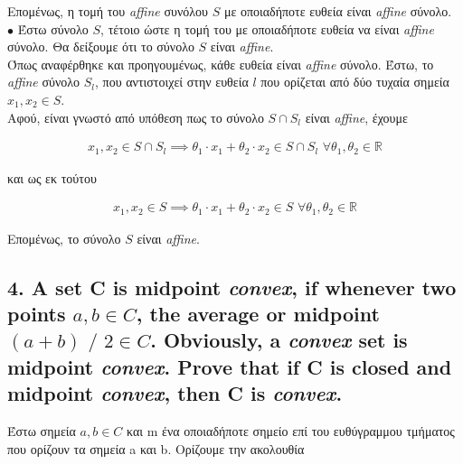 \documentclass[12pt]{article}
\newcommand{\R}{\mathbb{R}}
\newcommand{\margin}{\hspace{4pt}}
\begin{document}
Επομένως, η τομή του \textit{affine} συνόλου $S$ με οποιαδήποτε ευθεία είναι \textit{affine} σύνολο.\\

$\bullet$ Έστω σύνολο $S$, τέτοιο ώστε η τομή του με οποιαδήποτε ευθεία να είναι \textit{affine} σύνολο.
Θα δείξουμε ότι το σύνολο $S$ είναι \textit{affine}.\\

Όπως αναφέρθηκε και προηγουμένως, κάθε ευθεία είναι \textit{affine} σύνολο.
Έστω, το \textit{affine} σύνολο $S_l$, που αντιστοιχεί στην ευθεία $l$
που ορίζεται από δύο τυχαία σημεία $x_1, x_2 \in S$.\\

Αφού, είναι γνωστό από υπόθεση πως το σύνολο $S \cap S_l$ είναι \textit{affine}, έχουμε

\begin{align*}
    x_1, x_2 \in S \cap S_l \implies  \theta_1 \cdot x_1 + \theta_2 \cdot x_2 \in S \cap S_l \margin \forall \theta_1, \theta_2 \in \R
\end{align*}

και ως εκ τούτου

\begin{align*}
    x_1, x_2 \in S \implies  \theta_1 \cdot x_1 + \theta_2 \cdot x_2 \in S \margin \forall \theta_1, \theta_2 \in \R
\end{align*}

Επομένως, το σύνολο $S$ είναι \textit{affine}.

\vspace{2in} %

\pagebreak

\subsection*{4. A set C is midpoint \textit{convex}, if whenever two points $a, b \in C$, the average or midpoint
$(a + b) \text{ / } 2 \in C$. Obviously, a \textit{convex} set is midpoint \textit{convex}. Prove that if C is closed and
midpoint \textit{convex}, then C is \textit{convex}.}

Έστω σημεία $a, b \in C$ και m ένα οποιαδήποτε σημείο επί του ευθύγραμμου τμήματος που ορίζουν τα σημεία a και b.
Ορίζουμε την ακολουθία\\
\end{document}
